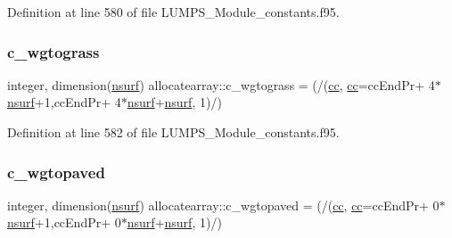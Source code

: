 Definition at line 580 of file L\+U\+M\+P\+S\+\_\+\+Module\+\_\+constants.\+f95.

\mbox{\label{namespaceallocatearray_a2380302825185573946e16feb348a938}} 
\subsubsection{\texorpdfstring{c\+\_\+wgtograss}{c\_wgtograss}}
{\footnotesize\ttfamily integer, dimension(\hyperlink{namespaceallocatearray_acd22f92a06f7e9a2a91426b3dc99fdb0}{nsurf}) allocatearray\+::c\+\_\+wgtograss = (/(\hyperlink{namespaceallocatearray_ac863c81704eb507dee10f5e10741e10c}{cc}, \hyperlink{namespaceallocatearray_ac863c81704eb507dee10f5e10741e10c}{cc}=cc\+End\+Pr+ 4$\ast$\hyperlink{namespaceallocatearray_acd22f92a06f7e9a2a91426b3dc99fdb0}{nsurf}+1,cc\+End\+Pr+ 4$\ast$\hyperlink{namespaceallocatearray_acd22f92a06f7e9a2a91426b3dc99fdb0}{nsurf}+\hyperlink{namespaceallocatearray_acd22f92a06f7e9a2a91426b3dc99fdb0}{nsurf}, 1)/)}



Definition at line 582 of file L\+U\+M\+P\+S\+\_\+\+Module\+\_\+constants.\+f95.

\mbox{\label{namespaceallocatearray_a87dc79c99be72e47ace7d44501611752}} 
\subsubsection{\texorpdfstring{c\+\_\+wgtopaved}{c\_wgtopaved}}
{\footnotesize\ttfamily integer, dimension(\hyperlink{namespaceallocatearray_acd22f92a06f7e9a2a91426b3dc99fdb0}{nsurf}) allocatearray\+::c\+\_\+wgtopaved = (/(\hyperlink{namespaceallocatearray_ac863c81704eb507dee10f5e10741e10c}{cc}, \hyperlink{namespaceallocatearray_ac863c81704eb507dee10f5e10741e10c}{cc}=cc\+End\+Pr+ 0$\ast$\hyperlink{namespaceallocatearray_acd22f92a06f7e9a2a91426b3dc99fdb0}{nsurf}+1,cc\+End\+Pr+ 0$\ast$\hyperlink{namespaceallocatearray_acd22f92a06f7e9a2a91426b3dc99fdb0}{nsurf}+\hyperlink{namespaceallocatearray_acd22f92a06f7e9a2a91426b3dc99fdb0}{nsurf}, 1)/)}



